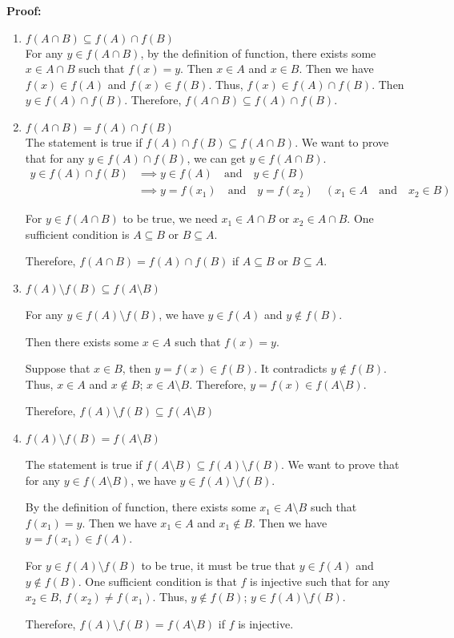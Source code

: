 \documentclass[12pt]{article}
\newcommand{\fasb}{
f(A) \cap f(B)
}
\newcommand{\fab}{
f(A \cap B)
}
\newcommand{\fxab}{
    f(A) \setminus f(B)
}
\newcommand{\faxb}{
    f(A \setminus B)
}
\newcommand{\fxstTwo}{
\fxab \subseteq \faxb
}
\newcommand{\fxstThree}{
\fxab = \faxb
}
\newcommand{\fxstFour}{
\faxb \subseteq \fxab
}
\begin{document}
\textbf{Proof:}
\renewcommand{\labelenumi}{\alph{enumi})}
\renewcommand{\labelenumii}{\arabic{enumii})}
\begin{enumerate}
    \item \(f(A \cap B) \subseteq f(A) \cap f(B)\)\\
    For any \(y \in f(A \cap B)\), by the definition of function, there exists some \(x \in A \cap B\) such that \(f(x) = y \).
    Then \(x \in A\) and \(x \in B\). Then we have \(f(x) \in f(A)\) and \(f(x) \in f(B)\). Thus, \(f(x) \in f(A) \cap f(B)\).
    Then \(y \in f(A) \cap f(B)\). Therefore, \(f(A \cap B) \subseteq f(A) \cap f(B)\).
    \item \(\fab = \fasb \)\\
    The statement is true if \(\fasb \subseteq \fab\). We want to prove that for any \(y \in \fasb\),
    we can get \(y \in \fab\).
    \begin{equation}
        \begin{aligned}
        y \in \fasb & \implies y \in f(A) \quad \text{and} \quad y \in f(B)\\
        & \implies y = f(x_1) \quad \text{and} \quad y = f(x_2) \quad
        (x_1 \in A \quad \text{and} \quad  x_2 \in B)
        \end{aligned}
    \end{equation}

    For \(y \in \fab\) to be true, we need \(x_1 \in A \cap B\) or \(x_2 \in A \cap B\).
    One sufficient condition is \(A \subseteq B\) or \(B \subseteq A\).

    Therefore, \(\fab = \fasb\) if \(A \subseteq B\) or \(B \subseteq A\).

    \item \(\fxstTwo\)

    For any \(y \in \fxab\), we have \(y \in f(A)\) and \(y \notin f(B)\).

    Then there exists some \(x \in A\) such that \(f(x)=y\).

    Suppose that \(x \in B\), then \(y = f(x) \in f(B)\). It contradicts \(y \notin f(B)\).
    Thus, \(x \in A\) and \(x \notin B\); \(x \in A \setminus B\). Therefore, \(y = f(x) \in \faxb\).

    Therefore, \(\fxstTwo\)

    \item \(\fxstThree\)

    The statement is true if \(\fxstFour\). We want to prove that for any \(y \in \faxb\), we have
    \(y \in \fxab\).

    By the definition of function, there exists some \(x_1 \in A \setminus B\) such that \(f(x_1)=y\).
    Then we have \(x_1 \in A\) and \(x_1 \notin B\). Then we have \(y= f(x_1) \in f(A)\).

    For \(y \in \fxab\) to be true, it must be true that \(y \in f(A)\) and \(y \notin f(B)\).
    One sufficient condition is that \(f\) is injective such that for any \(x_2 \in B\), \(f(x_2) \neq f(x_1)\).
    Thus, \(y \notin f(B)\); \(y \in \fxab\).

    Therefore, \(\fxstThree\) if \(f\) is injective.


\end{enumerate}
\end{document}
